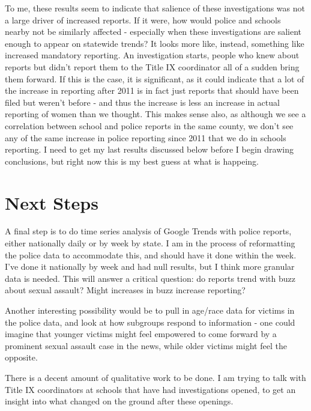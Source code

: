 \documentclass[AER]{AEA}
\begin{document}
To me, these results seem to indicate that salience of these investigations was not a large driver of increased reports. If it were, how would police and schools nearby not be similarly affected - especially when these investigations are salient enough to appear on statewide trends? It looks more like, instead, something like increased mandatory reporting. An investigation starts, people who knew about reports but didn't report them to the Title IX coordinator all of a sudden bring them forward. If this is the case, it is significant, as it could indicate that a lot of the increase in reporting after 2011 is in fact just reports that should have been filed but weren't before - and thus the increase is less an increase in actual reporting of women than we thought. This makes sense also, as although we see a correlation between school and police reports in the same county, we don't see any of the same increase in police reporting since 2011 that we do in schools reporting.  I need to get my last results discussed below before I begin drawing conclusions, but right now this is my best guess at what is happeing. 

\section{Next Steps}

A final step is to do time series analysis of Google Trends with police reports, either nationally daily or by week by state. I am in the process of reformatting the police data to accommodate this, and should have it done within the week. I've done it nationally by week and had null results, but I think more granular data is needed. This will answer a critical question: do reports trend with buzz about sexual assault? Might increases in buzz increase reporting?

Another interesting possibility would be to pull in age/race data for victims in the police data, and look at how subgroups respond to information - one could imagine that younger victims might feel empowered to come forward by a prominent sexual assault case in the news, while older victims might feel the opposite.

There is a decent amount of qualitative work to be done. I am trying to talk with Title IX coordinators at schools that have had investigations opened, to get an insight into what changed on the ground after these openings.

\clearpage
\end{document}
